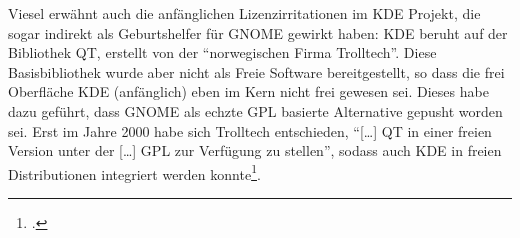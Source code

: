 \documentclass[DIV=calc,BCOR=5mm,11pt,headings=small,oneside,abstract=true, toc=bib]{scrartcl}
\begin{document}
Viesel erwähnt auch die anfänglichen Lizenzirritationen im KDE Projekt, die
sogar indirekt als Geburtshelfer für GNOME gewirkt haben: KDE beruht auf der
Bibliothek QT, erstellt von der \enquote{norwegischen Firma Trolltech}.
Diese Basisbibliothek wurde aber nicht als Freie Software bereitgestellt, so
dass die frei Oberfläche KDE (anfänglich) eben im Kern nicht frei gewesen sei.
Dieses habe dazu geführt, dass GNOME als echzte GPL basierte Alternative gepusht
worden sei. Erst im Jahre 2000 habe sich Trolltech entschieden, \enquote{[\ldots]
QT in einer freien Version unter der [\ldots] GPL zur Verfügung zu
stellen}, sodass auch KDE in freien Distributionen integriert werden
konnte\footcite[vgl.][165 s.a. 167f]{Viesel2006a}.

\small

\end{document}
